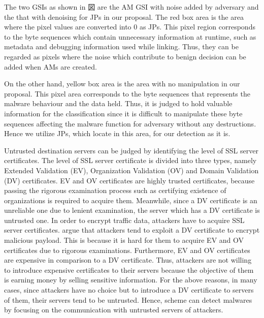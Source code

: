 The two GSIs as shown in 図 are the AM GSI with noise added by adversary and the that with denoising for JPs in our proposal.
The red box area is the area where the pixel values are converted into 0 as JPs.
This pixel region corresponds to the byte sequences which contain unnecessary information at runtime, such as metadata and debugging information used while linking.
Thus, they can be regarded as pixels where the noise which contribute to benign decision can be added when AMs are created.

On the other hand, yellow box area is the area with no manipulation in our proposal.
This pixel area corresponds to the byte sequences that represents the malware behaviour and the data held.
Thus, it is judged to hold valuable information for the classification since it is difficult to manipulate these byte sequences affecting the malware function for adversary without any destructions.
Hence we utilize JPs, which locate in this area, for our detection as it is.



Untrusted destination servers can be judged by identifying the level of SSL server certificates.  
The level of SSL server certificate is divided into three types, namely Extended Validation (EV), Organization Validation (OV) and Domain Validation (DV) certificates.
EV and OV certificates are highly trusted certificates, because passing the rigorous examination process such as certifying existence of organizations is required to acquire them. 
Meanwhile, since a DV certificate is an unreliable one due to lenient examination, the server which has a DV certificate is untrusted one.
In order to encrypt traffic data, attackers have to acquire SSL server certificates.
\We argue that attackers tend to exploit a DV certificate to encrypt malicious payload.
This is because it is hard for them to acquire EV and OV certificates due to rigorous examinations.
Furthermore, EV and OV certificates are expensive in comparison to a DV certificate.
Thus, attackers are not willing to introduce expensive certificates to their servers because the objective of them is earning money by selling sensitive information.
For the above reasons, in many cases, since attackers have no choice but to introduce a DV certificate to servers of them, their servers tend to be untrusted.
Hence, \our scheme can detect malwares by focusing on the communication with untrusted servers of attackers.

